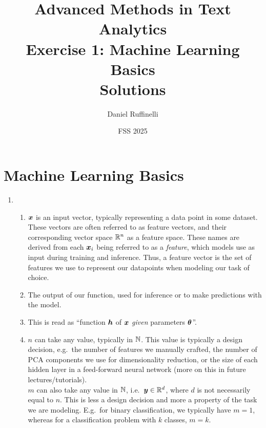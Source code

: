 \documentclass[11pt,a4paper]{article}
\title{Advanced Methods in Text Analytics \\ 
Exercise 1: Machine Learning Basics \\ 
\textbf{Solutions}}
\author{Daniel Ruffinelli}
\date{FSS 2025}
\begin{document}
\maketitle

\section{Machine Learning Basics}

\begin{enumerate}[label=(\alph*)]
    \item
          \begin{enumerate}[label=(\roman*)]
              \item ${\boldsymbol{x}}$ is an input vector, typically representing a data
                    point in some dataset. These vectors are often referred to
                    as feature vectors, and their corresponding vector space
                    $\mathbb{R}^n$ as a feature space.
                    These names are derived from each ${\boldsymbol{x}}_i$ being referred to
                    as a \emph{feature}, which models use as input during
                    training and inference.
                    Thus, a feature vector is the set of features we use to
                    represent our datapoints when modeling our task of choice.
              \item The output of our function, used for inference or to make
                    predictions with the model.
              \item This is read as ``function ${\boldsymbol{h}}$ of ${\boldsymbol{x}}$ \emph{given}
                    parameters ${\boldsymbol{\theta}}$''.
              \item $n$ can take any value, typically in $\mathbb{N}$. This value is
                    typically a design decision, e.g.\ the number of features we
                    manually crafted, the number of PCA components we use for
                    dimensionality reduction, or the size of each hidden layer
                    in a feed-forward neural network (more on this in future
                    lectures/tutorials). \\
                    $m$ can also take any value in $\mathbb{N}$, i.e.\
                    ${\boldsymbol{y}}\in\mathbb{R}^d$, where $d$ is not necessarily equal to
                    $n$. This is less a design decision and more a property of
                    the task we are modeling. E.g.\ for binary classification,
                    we typically have $m=1$, whereas for a classification
                    problem with $k$ classes, $m=k$.

\end{enumerate}
\end{enumerate}
\end{document}
